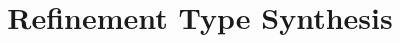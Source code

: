 \title{Refinement Type Synthesis}

\ifdefined\DRAFT
 \pagestyle{fancyplain}
 \rhead{\thedate}
\fi

\author{}
